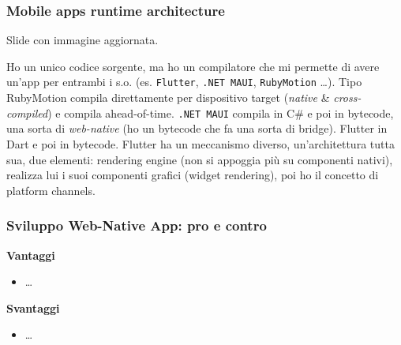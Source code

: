 \subsubsection{Mobile apps runtime architecture}
\par Slide con immagine aggiornata. 
\par Ho un unico codice sorgente, ma ho un compilatore che mi permette di avere un'app per entrambi i s.o. (es. \texttt{Flutter}, \texttt{.NET MAUI}, \texttt{RubyMotion} \dots). Tipo RubyMotion compila direttamente per dispositivo target (\textit{native} \& \textit{cross-compiled}) e compila ahead-of-time. \texttt{.NET MAUI} compila in C\# e poi in bytecode, una sorta di \textit{web-native} (ho un bytecode che fa una sorta di bridge). Flutter in Dart e poi in bytecode. Flutter ha un meccanismo diverso, un'architettura tutta sua, due elementi: rendering engine (non si appoggia più su componenti nativi), realizza lui i suoi componenti grafici (widget rendering), poi ho il concetto di platform channels.

\subsubsection{Sviluppo Web-Native App: pro e contro}
\par \textbf{Vantaggi}
\begin{itemize}
    \item \dots
\end{itemize}
\par \textbf{Svantaggi}
\begin{itemize}
    \item \dots
\end{itemize}



